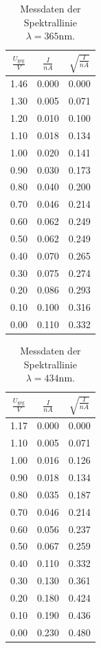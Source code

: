 \begin{table}
\centering
	\label{tabb:UV}
	\caption{Messdaten der Spektrallinie $\lambda = 365 \text{nm}$.}
	\begin{tabular}{c|c|c}
		\toprule
		{$\frac{U_\text{geg}}{V}$}&{$\frac{I}{nA}$}&{$\sqrt{\frac{I}{nA}}$} \\
		\hline
        \midrule
        1.46 &0.000&0.000\\
	1.30 &0.005&0.071\\
	1.20 &0.010&0.100\\
	1.10 &0.018&0.134\\
	1.00 &0.020&0.141\\
	0.90 &0.030&0.173\\
	0.80 &0.040&0.200\\
	0.70 &0.046&0.214\\
	0.60 &0.062&0.249\\
	0.50 &0.062&0.249\\
	0.40 &0.070&0.265\\
	0.30 &0.075&0.274\\
	0.20 &0.086&0.293\\
	0.10 &0.100&0.316\\
	0.00 &0.110&0.332\\	
	\bottomrule 
	\end{tabular}
\end{table}
\begin{table}
\centering
	\label{tab:blau}
	\caption{Messdaten der Spektrallinie $\lambda = 434 \text{nm}$.}
	\begin{tabular}{c|c|c}
		\toprule
		{$\frac{U_\text{geg}}{V}$}&{$\frac{I}{nA}$}&{$\sqrt{\frac{I}{nA}}$} \\
		\hline
        \midrule
	1.17 &0.000&0.000\\
	1.10 &0.005&0.071\\
	1.00 &0.016&0.126\\
	0.90 &0.018&0.134\\
	0.80 &0.035&0.187\\
	0.70 &0.046&0.214\\
	0.60 &0.056&0.237\\
	0.50 &0.067&0.259\\
	0.40 &0.110&0.332\\
	0.30 &0.130&0.361\\
	0.20 &0.180&0.424\\
	0.10 &0.190&0.436\\
	0.00 &0.230&0.480\\
	\bottomrule 
	\end{tabular}
\end{table}
